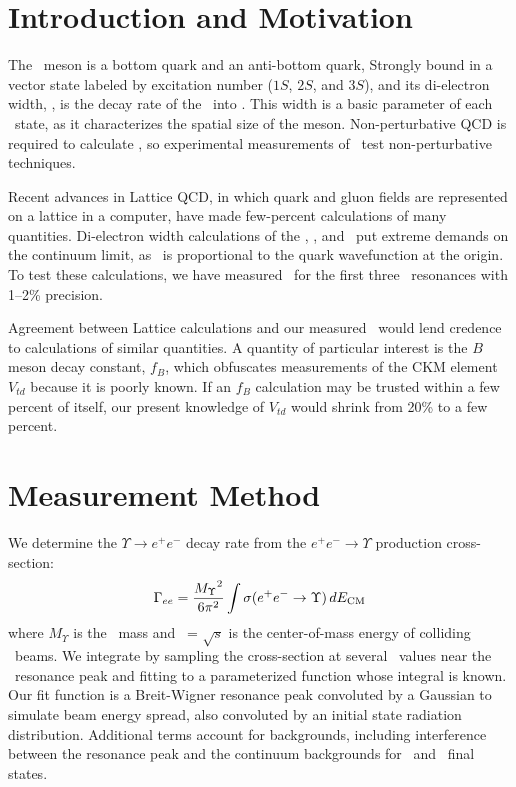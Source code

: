 \documentclass{ws-procs9x6}
\begin{document}
\section{Introduction and Motivation}

The \ups\ meson is a bottom quark and an anti-bottom quark, Strongly
bound in a vector state labeled by excitation number ($1S$, $2S$, and
$3S$), and its di-electron width, \gee, is the decay rate of the \ups\
into \ee.  This width is a basic parameter of each \ups\ state, as it
characterizes the spatial size of the meson.  Non-perturbative QCD is
required to calculate \gee, so experimental measurements of \gee\ test
non-perturbative techniques.

Recent advances in Lattice QCD, in which quark and gluon fields are
represented on a lattice in a computer, have made few-percent
calculations of many quantities\cite{unquenched}.  Di-electron width
calculations of the \us, \uss, and \usss\ put extreme demands on the
continuum limit, as \gee\ is proportional to the quark wavefunction at
the origin.  To test these calculations, we have measured \gee\ for
the first three \ups\ resonances with 1--2\% precision.

Agreement between Lattice calculations and our measured \gee\ would
lend credence to calculations of similar quantities.  A quantity of
particular interest is the $B$ meson decay constant, $f_B$, which
obfuscates measurements of the CKM element $V_{td}$ because it is
poorly known.  If an $f_B$ calculation may be trusted within a few
percent of itself, our present knowledge of $V_{td}$ would shrink from
20\% to a few percent.

\section{Measurement Method}

We determine the $\Upsilon \to e^+e^-$ decay rate from the $e^+e^- \to
\Upsilon$ production cross-section:
\begin{equation}
  \Gamma_{ee} = \frac{{M_\Upsilon}^2}{6\pi^2} \int \sigma(e^+e^- \to
  \Upsilon) \, dE_\subs{CM}
\end{equation}
where $M_\Upsilon$ is the \ups\ mass and \ecm\ = $\sqrt{s}$ is the
center-of-mass energy of colliding \ee\ beams.  We integrate by
sampling the cross-section at several \ecm\ values near the \ups\
resonance peak and fitting to a parameterized function whose integral is
known.  Our fit function is a Breit-Wigner resonance peak convoluted
by a Gaussian to simulate beam energy spread, also convoluted by an
initial state radiation distribution\cite{kf}.  Additional terms
account for backgrounds, including interference between the resonance
peak and the continuum backgrounds for \qqbar\ and \tautau\ final
states.
\end{document}
